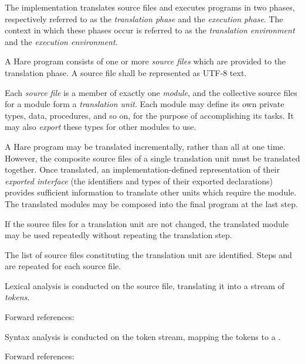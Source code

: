 
\specitem
The implementation translates source files and executes programs in two phases,
respectively referred to as the \textit{translation phase} and the
\textit{execution phase}. The context in which these phases occur is referred
to as the \textit{translation environment} and the \textit{execution
environment}.


\specsubitem
A Hare program consists of one or more \textit{source files} which are provided
to the translation phase. A source file shall be represented as \hbox{UTF-8}
text.

\specsubitem
Each \textit{source file} is a member of exactly one \textit{module}, and the
collective source files for a module form a \textit{translation unit}. Each
module may define its own private types, data, procedures, and so on, for the
purpose of accomplishing its tasks. It may also \textit{export} these types for
other modules to use.

\specsubitem
A Hare program may be translated incrementally, rather than all at one time.
However, the composite source files of a single translation unit must be
translated together. Once translated, an implementation-defined representation
of their \textit{exported interface} (the identifiers and types of their
exported declarations) provides sufficient information to translate other units
which require the module. The translated modules may be composed into the final
program at the last step.

\specsubitem
If the source files for a translation unit are not changed, the translated
module may be used repeatedly without repeating the translation step.


\specsubitem
The list of source files constituting the translation unit are identified. Steps
 and  are
repeated for each source file.

\specsubitem
Lexical analysis is conducted on the source file, translating it into a stream
of \textit{tokens}.

Forward references: 

\specsubitem
Syntax analysis is conducted on the token stream, mapping the tokens to a
.

Forward references: 

